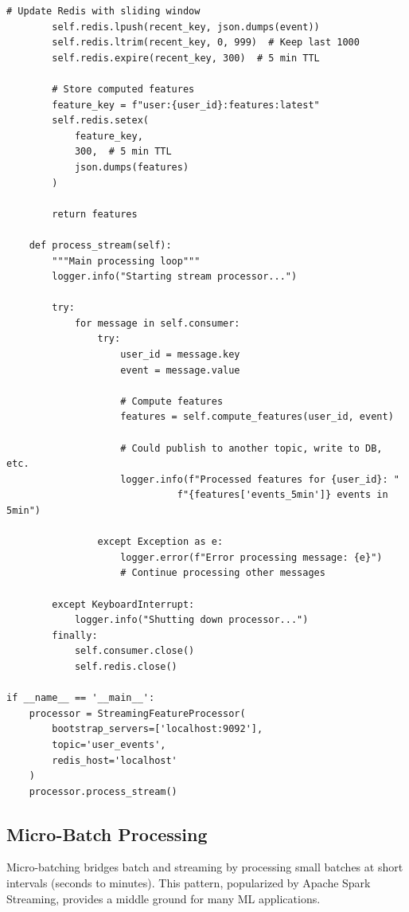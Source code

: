 \begin{lstlisting}[style=python, caption=Kafka consumer for streaming feature processing]
        # Update Redis with sliding window
        self.redis.lpush(recent_key, json.dumps(event))
        self.redis.ltrim(recent_key, 0, 999)  # Keep last 1000
        self.redis.expire(recent_key, 300)  # 5 min TTL

        # Store computed features
        feature_key = f"user:{user_id}:features:latest"
        self.redis.setex(
            feature_key,
            300,  # 5 min TTL
            json.dumps(features)
        )

        return features

    def process_stream(self):
        """Main processing loop"""
        logger.info("Starting stream processor...")

        try:
            for message in self.consumer:
                try:
                    user_id = message.key
                    event = message.value

                    # Compute features
                    features = self.compute_features(user_id, event)

                    # Could publish to another topic, write to DB, etc.
                    logger.info(f"Processed features for {user_id}: "
                              f"{features['events_5min']} events in 5min")

                except Exception as e:
                    logger.error(f"Error processing message: {e}")
                    # Continue processing other messages

        except KeyboardInterrupt:
            logger.info("Shutting down processor...")
        finally:
            self.consumer.close()
            self.redis.close()

if __name__ == '__main__':
    processor = StreamingFeatureProcessor(
        bootstrap_servers=['localhost:9092'],
        topic='user_events',
        redis_host='localhost'
    )
    processor.process_stream()
\end{lstlisting}

\subsection{Micro-Batch Processing}

Micro-batching bridges batch and streaming by processing small batches at short intervals (seconds to minutes). This pattern, popularized by Apache Spark Streaming, provides a middle ground for many ML applications.


